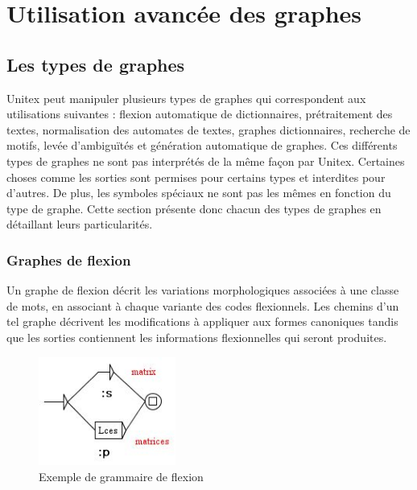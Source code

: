 \chapter{Utilisation avancée des graphes}
\label{chap-advanced-grammars}
\section{Les types de graphes}
Unitex peut manipuler plusieurs types de graphes qui correspondent aux utilisations
suivantes : flexion automatique de dictionnaires, prétraitement des textes, normalisation
des automates de textes, graphes dictionnaires, recherche de motifs, levée d’ambiguïtés et
génération automatique de graphes. Ces différents types de graphes ne sont pas interprétés
de la même façon par Unitex. Certaines choses comme les sorties sont permises pour certains
types et interdites pour d’autres. De plus, les symboles spéciaux ne sont pas les mêmes en
fonction du type de graphe. Cette section présente donc chacun des types de graphes en
détaillant leurs particularités.


\subsection{Graphes de flexion}
Un graphe de flexion décrit les variations morphologiques associées à une classe de
mots, en associant à chaque variante des codes flexionnels. Les chemins d’un tel graphe décrivent
les modifications à appliquer aux formes canoniques tandis que les sorties contiennent
les informations flexionnelles qui seront produites.


\bigskip
\begin{figure}[!ht]
\begin{center}
\includegraphics[width=4.5cm]{resources/img/fig6-1.png}
\caption{Exemple de grammaire de flexion}
\end{center}
\end{figure}

